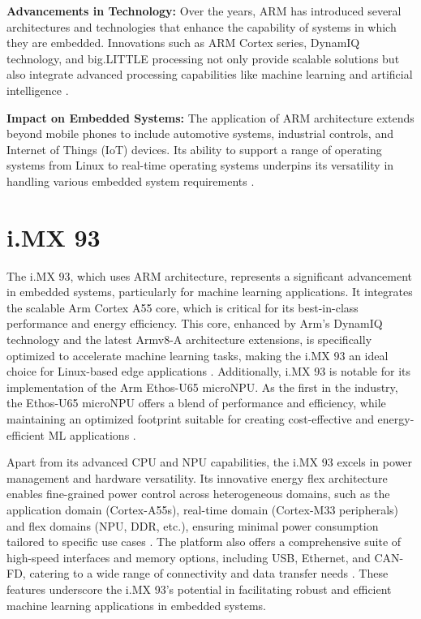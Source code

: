 \textbf{Advancements in Technology:} Over the years, ARM has introduced several architectures and technologies that enhance the capability of systems in which they are embedded. Innovations such as ARM Cortex series, DynamIQ technology, and big.LITTLE processing not only provide scalable solutions but also integrate advanced processing capabilities like machine learning and artificial intelligence \cite{iMX93FAMFS}.

\textbf{Impact on Embedded Systems:} The application of ARM architecture extends beyond mobile phones to include automotive systems, industrial controls, and Internet of Things (IoT) devices. Its ability to support a range of operating systems from Linux to real-time operating systems underpins its versatility in handling various embedded system requirements \cite{iMX_LINUX_EMBEDDED}.

\section{i.MX 93}
The i.MX 93, which uses ARM architecture, represents a significant advancement in embedded systems, particularly for machine learning applications. It integrates the scalable Arm Cortex A55 core, which is critical for its best-in-class performance and energy efficiency. This core, enhanced by Arm's DynamIQ technology and the latest Armv8-A architecture extensions, is specifically optimized to accelerate machine learning tasks, making the i.MX 93 an ideal choice for Linux-based edge applications \cite{iMX93FAMFS}. Additionally, i.MX 93 is notable for its implementation of the Arm Ethos-U65 microNPU. As the first in the industry, the Ethos-U65 microNPU offers a blend of performance and efficiency, while maintaining an optimized footprint suitable for creating cost-effective and energy-efficient ML applications \cite{iMX93FAMFS}.

Apart from its advanced CPU and NPU capabilities, the i.MX 93 excels in power management and hardware versatility. Its innovative energy flex architecture enables fine-grained power control across heterogeneous domains, such as the application domain (Cortex-A55s), real-time domain (Cortex-M33 peripherals) and flex domains (NPU, DDR, etc.), ensuring minimal power consumption tailored to specific use cases \cite{iMX93FAMFS}. The platform also offers a comprehensive suite of high-speed interfaces and memory options, including USB, Ethernet, and CAN-FD, catering to a wide range of connectivity and data transfer needs \cite{iMX93FAMFS}. These features underscore the i.MX 93's potential in facilitating robust and efficient machine learning applications in embedded systems.

